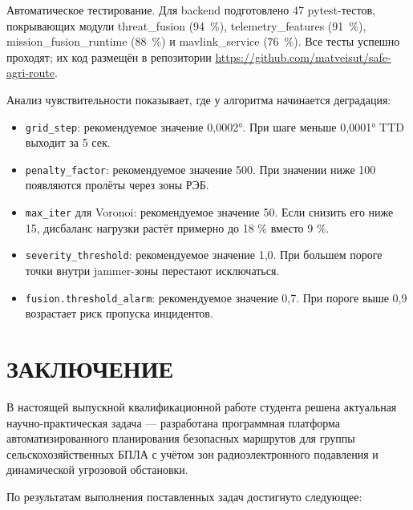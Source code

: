 \documentclass[14pt,a4paper]{extarticle}
\begin{document}
Автоматическое тестирование. Для backend подготовлено 47 pytest-тестов, покрывающих модули threat\_fusion (94~\%), telemetry\_features (91~\%), mission\_fusion\_runtime (88~\%) и mavlink\_service (76~\%). Все тесты успешно проходят; их код размещён в репозитории \url{https://github.com/matveisut/safe-agri-route}.

Анализ чувствительности показывает, где у алгоритма начинается деградация:

\begin{itemize}
\item \texttt{grid\_step}: рекомендуемое значение 0,0002°. При шаге меньше 0,0001° TTD выходит за 5 сек.
\item \texttt{penalty\_factor}: рекомендуемое значение 500. При значении ниже 100 появляются пролёты через зоны РЭБ.
\item \texttt{max\_iter} для Voronoi: рекомендуемое значение 50. Если снизить его ниже 15, дисбаланс нагрузки растёт примерно до 18 \% вместо 9 \%.
\item \texttt{severity\_threshold}: рекомендуемое значение 1,0. При большем пороге точки внутри jammer-зоны перестают исключаться.
\item \texttt{fusion.threshold\_alarm}: рекомендуемое значение 0,7. При пороге выше 0,9 возрастает риск пропуска инцидентов.
\end{itemize}



\hypertarget{ux437ux430ux43aux43bux44eux447ux435ux43dux438ux435}{%
\section{ЗАКЛЮЧЕНИЕ}\label{ux437ux430ux43aux43bux44eux447ux435ux43dux438ux435}}

В настоящей выпускной квалификационной работе студента решена актуальная научно-практическая задача --- разработана программная платформа автоматизированного планирования безопасных маршрутов для группы сельскохозяйственных БПЛА с учётом зон радиоэлектронного подавления и динамической угрозовой обстановки.

По результатам выполнения поставленных задач достигнуто следующее:
\end{document}
